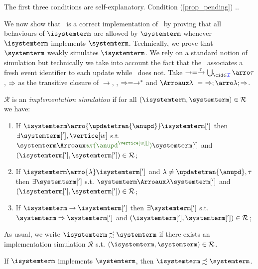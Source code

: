 The  first three conditions are self-explanatory. Condition (\ref{prop_pending})  ..

We  now show that \igsp\ is a correct implementation of \gsp\ by proving that all behaviours of $\isystemterm$  are allowed by $\systemterm$ 
whenever $\isystemterm$  implements $\systemterm$. Technically,  we prove that $\systemterm$ weakly simulates $\isystemterm$. 
 We rely on a standard notion of simulation but technically we take into account the fact that
the \gsp\ associates a fresh event identifier to each update while \igsp\ does not. Take  $\rightarrow = \tr{\tau} \bigcup_{\cid\in\idset} \arroi{\tau}$,
 $\Rightarrow$ as the transitive closure of $\rightarrow$, \ie, $\Rightarrow = \rightarrow^*$ and 
 $\Arroi{\lambda} \ = \ \Arro;\arroi{\lambda};\Arro$.
 
 

\begin{definition}[simulation] $\mathcal{R}$ is an {\em implementation simulation} if for all 
$(\isystemterm,\systemterm)\in\mathcal{R}$ we have:
\begin{enumerate}
   \item If $\isystemterm\arro{\updatetran{\anupd}}\isystemterm[']$ then  $\exists\systemterm['],\vertice[w]$ s.t.  $\systemterm\Arroi{\updatetranaux{\anupd^{\vertice[w][]}}}\systemterm[']$ and $(\isystemterm['],\systemterm['])\in\mathcal{R}$;
   \item If $\isystemterm\arro{\lambda}\isystemterm[']$ and $\lambda\neq \updatetran{\anupd},\tau$ then  $\exists\systemterm[']$  s.t.  $\systemterm\Arroi{\lambda}\systemterm[']$ and $(\isystemterm['],\systemterm['])\in\mathcal{R}$;
   \item If $\isystemterm\tr{}\isystemterm[']$  then  $\exists\systemterm[']$  s.t.  $\systemterm\Arro\systemterm[']$ and $(\isystemterm['],\systemterm['])\in\mathcal{R}$;
\end{enumerate} 
\end{definition}

As usual, we write $\isystemterm\precsim\systemterm$ if there exists an {implementation simulation} $\mathcal{R}$ s.t.  
$(\isystemterm,\systemterm)\in\mathcal{R}$.

%
%

\begin{theorem}
\label{thm:simulation}
 If  $\isystemterm$ implements $\systemterm$, then $\isystemterm\precsim\systemterm$. 
\end{theorem}

